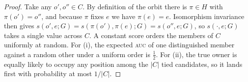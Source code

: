 \documentclass[10pt,a4paper]{amsart}
\theoremstyle{plain}
\theoremstyle{definition}
\theoremstyle{remark}
\begin{document}
\begin{proof}
Take any $o',o''\in C$. By definition of the orbit there is $\pi\in H$ with
$\pi(o')=o''$, and because $\pi$ fixes $e$ we have $\pi(e)=e$. Isomorphism
invariance then gives $s(o',e;G)=s(\pi(o'),\pi(e);G)=s(o'',e;G)$, so $s(\cdot,e;G)$
takes a single value across $C$. A constant score orders the members of $C$
uniformly at random. For (i), the expected \textsc{auc} of one distinguished
member against a random other under a uniform order is $\tfrac12$. For (ii), the
true owner is equally likely to occupy any position among the $|C|$ tied
candidates, so it lands first with probability at most $1/|C|$.
\end{proof}
\end{document}
